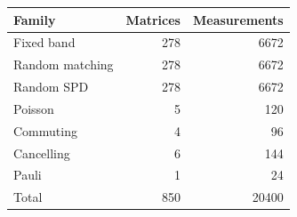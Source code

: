 \begin{tabular}{lrr}\toprule Family & Matrices & Measurements\\\midrule
Fixed band & 278 & 6672\\
Random matching & 278 & 6672\\
Random SPD & 278 & 6672\\
Poisson & 5 & 120\\
Commuting & 4 & 96\\
Cancelling & 6 & 144\\
Pauli & 1 & 24\\
\midrule Total & 850 & 20400\\\bottomrule\end{tabular}
